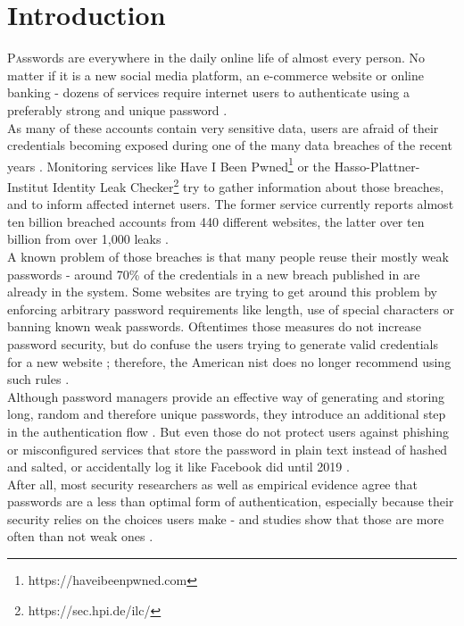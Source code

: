 
\section{Introduction}
\label{sec:intro}

\lettrine[nindent=0em,lines=3]{P}asswords are everywhere in the daily online life of almost every person. No matter if it is a new social media platform, an e-commerce website or online banking - dozens of services require internet users to authenticate using a preferably strong and unique password \cite{nist}.\\
As many of these accounts contain very sensitive data, users are afraid of their credentials becoming exposed during one of the many data breaches of the recent years \cite{statista_dossier2018}. Monitoring services like Have I Been Pwned\footnote{https://haveibeenpwned.com} or the Hasso-Plattner-Institut Identity Leak Checker\footnote{https://sec.hpi.de/ilc/} try to gather information about those breaches, and to inform affected internet users. The former service currently reports almost ten billion breached accounts from 440 different websites, the latter over ten billion from over 1,000 leaks \cite{hibp,hpi}.\\
A known problem of those breaches is that many people reuse their mostly weak passwords \cite{bailey2014} - around 70\% of the credentials in a new breach published in \cite{hibp} are already in the system. Some websites are trying to get around this problem by enforcing arbitrary password requirements like length, use of special characters or banning known weak passwords. Oftentimes those measures do not increase password security, but do confuse the users trying to generate valid credentials for a new website \cite{hunt2017}; therefore, the American \ac{nist} does no longer recommend using such rules \cite{nist}.\\
Although password managers provide an effective way of generating and storing long, random and therefore unique passwords, they introduce an additional step in the authentication flow \cite{lyastani2018}.
But even those do not protect users against phishing or misconfigured services that store the password in plain text instead of hashed and salted, or accidentally log it like Facebook did until 2019 \cite{gallagher2019}.\\
After all, most security researchers as well as empirical evidence agree that passwords are a less than optimal form of authentication, especially because their security relies on the choices users make - and studies show that those are more often than not weak ones \cite{hunt2018c,whitty2015}.\\
